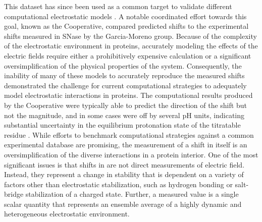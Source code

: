 This dataset has since been used as a common target to validate different computational electrostatic models \cite{Liu2018, Nielsen2011}. 
A notable coordinated effort towards this goal, known as the \pKa{} Cooperative, compared predicted \pKa{} shifts to the experimental \pKa{} shifts measured in SNase by the Garcia-Moreno group. 
Because of the complexity of the electrostatic environment in proteins, accurately modeling the effects of the electric fields require either a prohibitively expensive calculation or a significant oversimplification of the physical properties of the system. 
Consequently, the inability of many of these models to accurately reproduce the measured \pKa{} shifts demonstrated the challenge for current computational strategies to adequately model electrostatic interactions in proteins. 
The computational results produced by the \pKa{} Cooperative were typically able to predict the direction of the \pKa{} shift but not the magnitude, and in some cases were off by several pH units, indicating substantial uncertainty in the equilibrium protonation state of the titratable residue \cite{Alexov2011, Brooks2011}. 
While efforts to benchmark computational strategies against a common experimental database are promising, the measurement of a \pKa{} shift in itself is an oversimplification of the diverse interactions in a protein interior. 
One of the most significant issues is that shifts in \pKa{} are not direct measurements of electric field. 
Instead, they represent a change in stability that is dependent on a variety of factors other than electrostatic stabilization, such as hydrogen bonding or salt-bridge stabilization of a charged state. 
Further, a measured \pKa{} value is a single scalar quantity that represents an ensemble average of a highly dynamic and heterogeneous electrostatic environment. 

